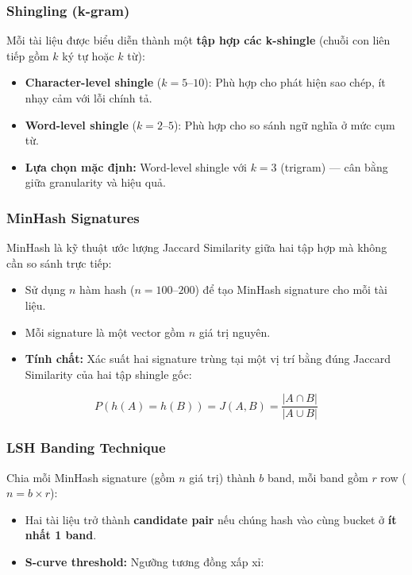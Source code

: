 \subsubsection{Shingling (k-gram)}

Mỗi tài liệu được biểu diễn thành một \textbf{tập hợp các k-shingle} (chuỗi con liên tiếp gồm $k$ ký tự hoặc $k$ từ):

\begin{itemize}
    \item \textbf{Character-level shingle} ($k = 5$--$10$): Phù hợp cho phát hiện sao chép, ít nhạy cảm với lỗi chính tả.
    \item \textbf{Word-level shingle} ($k = 2$--$5$): Phù hợp cho so sánh ngữ nghĩa ở mức cụm từ.
    \item \textbf{Lựa chọn mặc định:} Word-level shingle với $k = 3$ (trigram) --- cân bằng giữa granularity và hiệu quả.
\end{itemize}

\subsubsection{MinHash Signatures}

MinHash là kỹ thuật ước lượng Jaccard Similarity giữa hai tập hợp mà không cần so sánh trực tiếp:

\begin{itemize}
    \item Sử dụng $n$ hàm hash ($n = 100$--$200$) để tạo MinHash signature cho mỗi tài liệu.
    \item Mỗi signature là một vector gồm $n$ giá trị nguyên.
    \item \textbf{Tính chất:} Xác suất hai signature trùng tại một vị trí bằng đúng Jaccard Similarity của hai tập shingle gốc:
\end{itemize}

\begin{equation}
    P(h(A) = h(B)) = J(A, B) = \frac{|A \cap B|}{|A \cup B|}
\end{equation}

\subsubsection{LSH Banding Technique}

Chia mỗi MinHash signature (gồm $n$ giá trị) thành $b$ band, mỗi band gồm $r$ row ($n = b \times r$):

\begin{itemize}
    \item Hai tài liệu trở thành \textbf{candidate pair} nếu chúng hash vào cùng bucket ở \textbf{ít nhất 1 band}.
    \item \textbf{S-curve threshold:} Ngưỡng tương đồng xấp xỉ:
\end{itemize}

